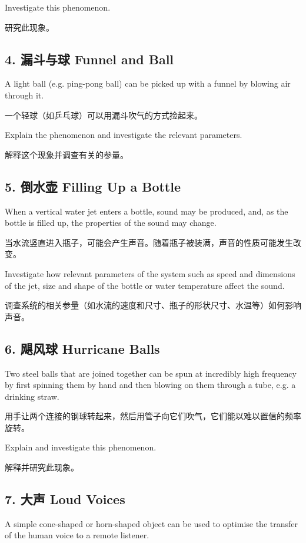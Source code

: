 \documentclass[a4paper,10pt,english]{sphinxmanual}
\begin{document}
Investigate this phenomenon.

研究此现象。


\subsection{4. 漏斗与球 Funnel and Ball}
\label{\detokenize{7. Appendix:funnel-and-ball}}
A light ball (e.g. ping-pong ball) can be picked up with a funnel by blowing air through it.

一个轻球（如乒乓球）可以用漏斗吹气的方式捡起来。

Explain the phenomenon and investigate the relevant parameters.

解释这个现象并调查有关的参量。


\subsection{5. 倒水壶 Filling Up a Bottle}
\label{\detokenize{7. Appendix:filling-up-a-bottle}}
When a vertical water jet enters a bottle, sound may be produced, and, as the bottle is filled up, the properties of the sound may change.

当水流竖直进入瓶子，可能会产生声音。随着瓶子被装满，声音的性质可能发生改变。

Investigate how relevant parameters of the system such as speed and dimensions of the jet, size and shape of the bottle or water temperature affect the sound.

调查系统的相关参量（如水流的速度和尺寸、瓶子的形状尺寸、水温等）如何影响声音。


\subsection{6. 飓风球 Hurricane Balls}
\label{\detokenize{7. Appendix:hurricane-balls}}
Two steel balls that are joined together can be spun at incredibly high frequency by first spinning them by hand and then blowing on them through a tube, e.g. a drinking straw.

用手让两个连接的钢球转起来，然后用管子向它们吹气，它们能以难以置信的频率旋转。

Explain and investigate this phenomenon.

解释并研究此现象。


\subsection{7. 大声 Loud Voices}
\label{\detokenize{7. Appendix:loud-voices}}
A simple cone-shaped or horn-shaped object can be used to optimise the transfer of the human voice to a remote listener.
\end{document}
